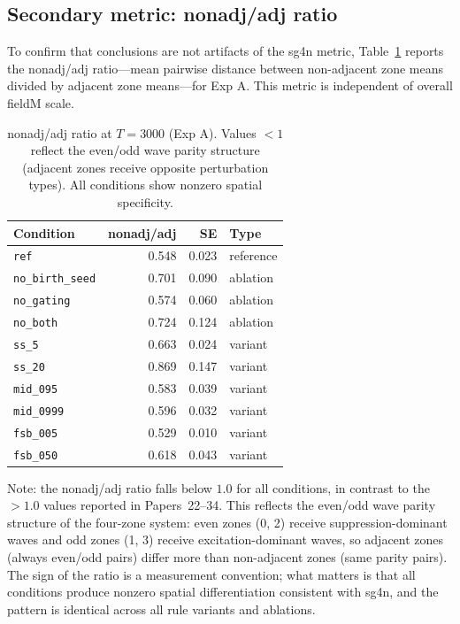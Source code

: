 \documentclass[11pt,a4paper]{article}
\begin{document}
\subsection{Secondary metric: nonadj/adj ratio}

To confirm that conclusions are not artifacts of the sg4n metric, Table~\ref{tab:ratio}
reports the nonadj/adj ratio---mean pairwise distance between non-adjacent zone means
divided by adjacent zone means---for Exp A.  This metric is independent of overall
fieldM scale.

\begin{table}[h]
\centering
\caption{nonadj/adj ratio at $T{=}3000$ (Exp A). Values $< 1$ reflect the even/odd
wave parity structure (adjacent zones receive opposite perturbation types).  All
conditions show nonzero spatial specificity.}
\label{tab:ratio}
\begin{tabular}{lrrl}
\toprule
\textbf{Condition} & \textbf{nonadj/adj} & \textbf{SE} & \textbf{Type}\\
\midrule
\texttt{ref}           & 0.548 & 0.023 & reference\\
\texttt{no\_birth\_seed} & 0.701 & 0.090 & ablation\\
\texttt{no\_gating}    & 0.574 & 0.060 & ablation\\
\texttt{no\_both}      & 0.724 & 0.124 & ablation\\
\texttt{ss\_5}         & 0.663 & 0.024 & variant\\
\texttt{ss\_20}        & 0.869 & 0.147 & variant\\
\texttt{mid\_095}      & 0.583 & 0.039 & variant\\
\texttt{mid\_0999}     & 0.596 & 0.032 & variant\\
\texttt{fsb\_005}      & 0.529 & 0.010 & variant\\
\texttt{fsb\_050}      & 0.618 & 0.043 & variant\\
\bottomrule
\end{tabular}
\end{table}

Note: the nonadj/adj ratio falls below $1.0$ for all conditions, in contrast to the
$>1.0$ values reported in Papers~22--34.  This reflects the even/odd wave parity
structure of the four-zone system: even zones (0, 2) receive suppression-dominant waves
and odd zones (1, 3) receive excitation-dominant waves, so adjacent zones (always
even/odd pairs) differ more than non-adjacent zones (same parity pairs).  The sign of
the ratio is a measurement convention; what matters is that all conditions produce
nonzero spatial differentiation consistent with sg4n, and the pattern is identical across
all rule variants and ablations.
\end{document}
